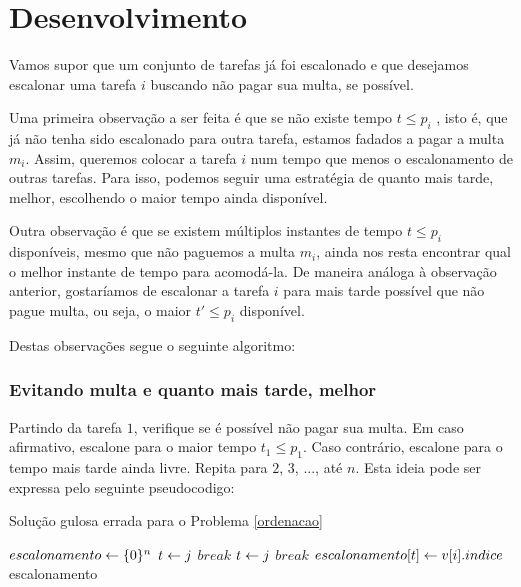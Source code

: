 \section{Desenvolvimento}

Vamos supor que um conjunto de tarefas já foi escalonado e que desejamos escalonar uma tarefa $i$ buscando não pagar sua multa, se possível.

Uma primeira observação a ser feita é que se não existe tempo $t \leq p_i$ , isto é, que já não tenha sido escalonado para outra tarefa, estamos fadados a pagar a multa $m_i$. Assim, queremos colocar a tarefa $i$ num tempo que menos  o escalonamento de outras tarefas. Para isso, podemos seguir uma estratégia de quanto mais tarde, melhor, escolhendo o maior tempo ainda disponível.

Outra observação é que se existem múltiplos instantes de tempo $t \leq p_i$ disponíveis, mesmo que não paguemos a multa $m_i$, ainda nos resta encontrar qual o melhor instante de tempo para acomodá-la. De maneira análoga à observação anterior, gostaríamos de escalonar a tarefa $i$ para mais tarde possível que não pague multa, ou seja, o maior $t' \leq p_i$ disponível.

Destas observações segue o seguinte algoritmo:

\subsubsection*{Evitando multa e quanto mais tarde, melhor}

Partindo da tarefa $1$, verifique se é possível não pagar sua multa. Em caso afirmativo, escalone para o maior tempo $t_1 \leq p_1$. Caso contrário, escalone para o tempo mais tarde ainda livre. Repita para $2$, $3$, ..., até $n$. Esta ideia pode ser expressa pelo seguinte pseudocodigo:

\begin{algorithm}[H]
\caption{Solução gulosa errada para o Problema \ref{ordenacao}}
\label{ordenacao:code_wrong}
\begin{algorithmic}[1]
    \State $escalonamento \leftarrow \{0\}^n$
                \State $t \leftarrow j$
                \State $break$
            \EndIf
        \EndFor
                \State $t \leftarrow j$
                \State $break$
            \EndIf
        \EndFor
        \State $escalonamento[t] \leftarrow v[i].indice$
    \EndFor
    \State \Return escalonamento
\EndFunction
\end{algorithmic}
\end{algorithm}

